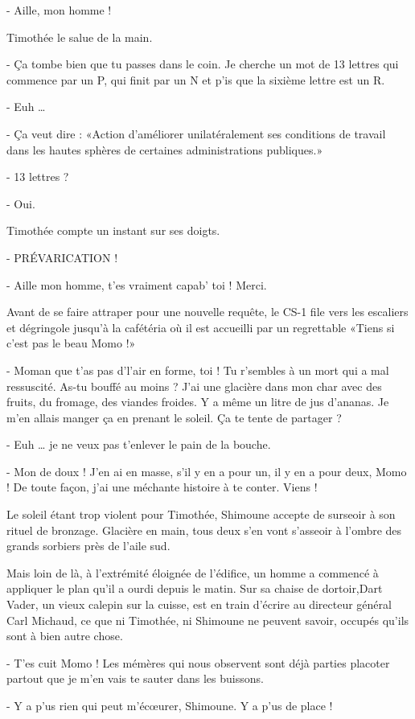 - Aille, mon homme !

Timothée le salue de la main.

- Ça tombe bien que tu passes dans le coin. Je cherche un mot de 13 lettres qui commence par un P, qui finit par un N et p’is que la sixième lettre est un R.

- Euh …

- Ça veut dire : «Action d’améliorer unilatéralement ses conditions de travail dans les hautes sphères de certaines administrations publiques.»

- 13 lettres ?

- Oui.

Timothée compte un instant sur ses doigts.

- PRÉVARICATION !

- Aille mon homme, t’es vraiment capab’ toi ! Merci.

Avant de se faire attraper pour une nouvelle requête, le CS-1 file vers les escaliers et dégringole jusqu’à la cafétéria où il est accueilli par un regrettable «Tiens si c’est pas le beau Momo !»

- Moman que t’as pas d’l’air en forme, toi ! Tu r’sembles à un mort qui a mal ressuscité. As-tu bouffé au moins ? J’ai une glacière dans mon char avec des fruits, du fromage, des viandes froides. Y a même un litre de jus d’ananas. Je m’en allais manger ça en prenant le soleil. Ça te tente de partager ?

- Euh … je ne veux pas t’enlever le pain de la bouche.

- Mon de doux ! J’en ai en masse, s’il y en a pour un, il y en a pour deux, Momo ! De toute façon, j’ai une méchante histoire à te conter. Viens !

Le soleil étant trop violent pour Timothée, Shimoune accepte de surseoir à son rituel de bronzage. Glacière en main, tous deux s’en vont s’asseoir à l’ombre des grands sorbiers près de l’aile sud.

Mais loin de là, à l’extrémité éloignée de l’édifice, un homme a commencé à appliquer le plan qu’il a ourdi depuis le matin. Sur sa chaise de dortoir,Dart Vader, un vieux calepin sur la cuisse, est en train d’écrire au directeur général Carl Michaud, ce que ni Timothée, ni Shimoune ne peuvent savoir, occupés qu’ils sont à bien autre chose.

- T’es cuit Momo ! Les mémères qui nous observent sont déjà parties placoter partout que je m’en vais te sauter dans les buissons.

- Y a p’us rien qui peut m’écœurer, Shimoune. Y a p’us de place !

